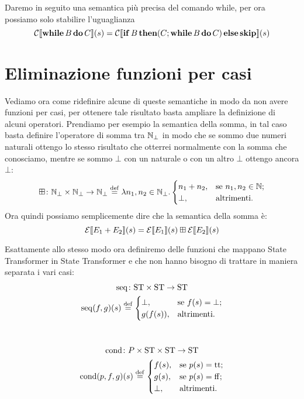 Daremo in seguito una semantica più precisa del comando while, per ora possiamo solo stabilire l'uguaglianza
$$\mathcal{C} \llbracket \mathop{\textup{\textbf{while}}} B \mathop{\textup{\textbf{do}}} C \rrbracket (s) = \mathcal{C} \llbracket \mathop{\textup{\textbf{if}}} B \mathop{\textup{\textbf{then}}} (C ; \mathop{\textup{\textbf{while}}} B \mathop{\textup{\textbf{do}}} C) \mathop{\textup{\textbf{else}}} \mathop{\textup{\textbf{skip}}} \rrbracket (s)$$

\section{Eliminazione funzioni per casi}
\label{sec:definizione di F}
Vediamo ora come ridefinire alcune di queste semantiche in modo da non avere funzioni per casi, per ottenere tale risultato basta ampliare la definizione di alcuni operatori. Prendiamo per esempio la semantica della somma, in tal caso basta definire l'operatore di somma tra $\mathbb{N}_\bot$ in modo che se sommo due numeri naturali ottengo lo stesso risultato che otterrei normalmente con la somma che conosciamo, mentre se sommo $\bot$ con un naturale o con un altro $\bot$ ottengo ancora $\bot$:
$$\fund{\conadd}{\Nset_\bot \times \Nset_\bot}{\Nset_\bot} \defeq \lambda n_1, n_2 \in \Nset_\bot . \begin{cases}
        n_1 + n_2, &\text{se $n_1, n_2 \in \Nset$;}\\
        \bot, &\text{altrimenti.}
        \end{cases}$$
Ora quindi possiamo semplicemente dire che la semantica della somma è:
$$\mathcal{E} \llbracket E_1 + E_2 \rrbracket (s) = \mathcal{E} \llbracket E_1 \rrbracket (s) \mathbin{\boxplus} \mathcal{E} \llbracket E_2 \rrbracket (s)$$

Esattamente allo stesso modo ora definiremo delle funzioni che mappano State Transformer in State Transformer e che non hanno bisogno di trattare in maniera separata i vari casi:
\begin{gather*}
\fund{\mathrm{seq}}{\ST \times \ST}{\ST} \\
\mathrm{seq}(f,g)(s) \defeq \begin{cases}
        \bot, &\text{se $f(s) = \bot$;}\\
        g(f(s)), &\text{altrimenti.}
        \end{cases}\\
\pts
\fund{\mathrm{cond}}{P \times \ST \times \ST}{\ST} \\
\mathrm{cond}(p,f,g)(s) \defeq \begin{cases}
        f(s), &\text{se $p(s) = \ttv$;}\\
        g(s), &\text{se $p(s) = \ffv$;}\\
        \bot, &\text{altrimenti.}
        \end{cases}\\
\end{gather*}

